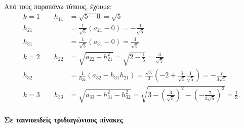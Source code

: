 \documentclass[11pt,a4paper,notitlepage,fleqn,final]{article}
\begin{document}
Από τους παραπάνω τύπους, έχουμε:
\begin{align*}
	\boxed{k=1} \qquad
	h_{11} &= \sqrt{5-0} = \sqrt{5} \\
	h_{21} &= \frac{1}{\sqrt{5}} \left(a_{21}-0\right)=
	-\frac{1}{\sqrt{5}} \\
	h_{31} &= \frac{1}{\sqrt{5}} (a_{31}-0)=\frac{3}{\sqrt{5}} \\
	\boxed{k=2} \qquad h_{22} &= \sqrt{a_{22}-h_{21}^2}
	= \sqrt{2-\frac{1}{5}} = \frac{3}{\sqrt{5}}
	\\ h_{32} &= \frac{1}{h_{22}}(a_{32}-h_{31}h_{21})
	=\frac{\sqrt{5}}{3}\left(
	-2+\frac{3}{\sqrt{5}}\frac{1}{\sqrt{5}}\right)
	= -\frac{7}{3\sqrt{5}}
	\\ \boxed{k=3} \qquad h_{33} &=
	\sqrt{a_{33}-h_{31}^2-h_{32}^2}=
	\sqrt{3-\left(\frac{3}{\sqrt{5}}\right)^2
	-\left(-\frac{7}{3\sqrt{5}}\right)^2} = \frac{1}{3}.
\end{align*}

\paragraph{Σε ταινιοειδείς τριδιαγώνιους πίνακες}
\hspace{0pt}
\end{document}
